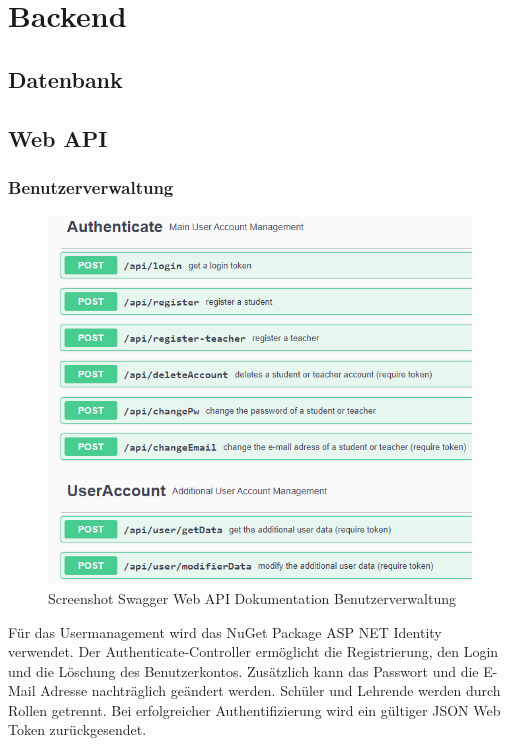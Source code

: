 \section{Backend}
\author{Stefano Pyringer}

\subsection{Datenbank}
\author{Stefano Pyringer}

\newpage

\subsection{Web API}
\author{Stefano Pyringer}

\subsubsection{Benutzerverwaltung}
\author{Stefano Pyringer}

\begin{figure}[h]
    \includegraphics*[width=15cm]{./pics/Screenshot_Swagger_Auth.png}
    \caption[Swagger Benutzerverwaltung]{Screenshot Swagger Web API Dokumentation Benutzerverwaltung}
\end{figure}

Für das Usermanagement wird das NuGet Package ASP NET Identity verwendet. Der Authenticate-Controller ermöglicht die Registrierung, den Login und die Löschung des Benutzerkontos. 
Zusätzlich kann das Passwort und die E-Mail Adresse nachträglich geändert werden. Schüler und Lehrende werden durch Rollen getrennt.
Bei erfolgreicher Authentifizierung wird ein gültiger JSON Web Token zurückgesendet. 

